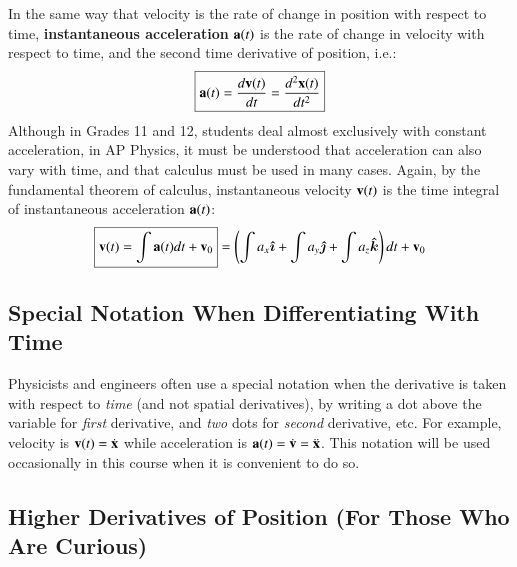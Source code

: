 \documentclass[11pt]{article}
\newcommand{\mb}[1]{\ensuremath\mathbf{#1}}
\begin{document}
In the same way that velocity is the rate of change in position with respect
to time, \textbf{instantaneous acceleration} $\mb{a}(t)$ is the rate of change
in velocity with respect to time, and the second time derivative of position,
i.e.:
\begin{equation}
  \boxed{\mb{a}(t)= \frac{d\mb{v}(t)}{dt}=\frac{d^2\mb{x}(t)}{dt^2}}
\end{equation}
Although in Grades 11 and 12, students deal almost exclusively with constant
acceleration, in AP Physics, it must be understood that acceleration can also
vary with time, and that calculus must be used in many cases.
Again, by the fundamental theorem of calculus, instantaneous velocity
$\mb{v}(t)$ is the time integral of instantaneous acceleration $\mb{a}(t)$:
\begin{equation}
  \boxed{\mb{v}(t)=\int\mb{a}(t)dt+\mb{v}_0}
  =
    \left(\int a_x\bm{\hat{\imath}} +
    \int a_y\bm{\hat{\jmath}} +
    \int a_z\bm{\hat{k}}\right) dt +\mb{v}_0
\end{equation}


\subsection{Special Notation When Differentiating With Time}

Physicists and engineers often use a special notation when the derivative is
taken with respect to \emph{time} (and not spatial derivatives), by writing a
dot above the variable for \emph{first} derivative, and \emph{two} dots for
\emph{second} derivative, etc. For example, velocity is
$\mb{v}(t)=\dot{\mb{x}}$ while acceleration is
$\mb{a}(t)= \dot{\mb{v}}=\ddot{\mb{x}}$. This notation will be used occasionally
in this course when it is convenient to do so.


\subsection{Higher Derivatives of Position (For Those Who Are Curious)}
\end{document}
